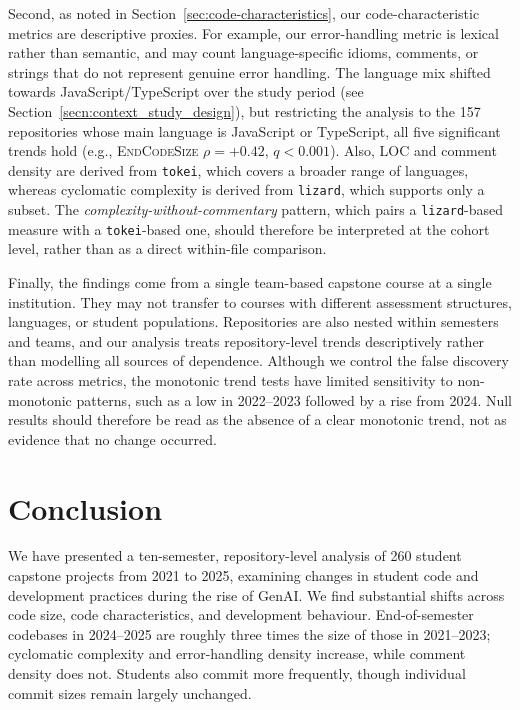 \documentclass[sigconf,authorversion]{acmart}
\newcommand{\todo}[1]{#1}
\begin{document}
\todo{Second, as noted in Section~\ref{sec:code-characteristics}, our code-characteristic metrics are descriptive proxies.} For example, our error-handling metric is lexical rather than semantic, and may count language-specific idioms, comments, or strings that do not represent \todo{genuine error handling}. The language mix shifted towards JavaScript/TypeScript over the study period (see Section~\ref{secn:context_study_design}), but restricting the analysis to the 157 repositories whose main language is JavaScript or TypeScript, all five significant trends hold (e.g., \textsc{EndCodeSize} $\rho = +0.42$, $q < 0.001$).
Also, LOC and comment density are derived from \texttt{tokei}, which covers a broader range of languages, whereas cyclomatic complexity is derived from \texttt{lizard}, which supports only a subset. The \emph{complexity-without-commentary} pattern, which pairs a \texttt{lizard}-based measure with a \texttt{tokei}-based one, should therefore be interpreted at the cohort level, rather than as a direct within-file comparison.

Finally, the findings come from a single team-based capstone course at a single institution. They may not transfer to courses with different assessment structures, languages, or student populations. Repositories are also nested within semesters and teams, and our analysis treats repository-level trends descriptively rather than modelling all sources of dependence. Although we control the false discovery rate across metrics, the monotonic trend tests have limited sensitivity to non-monotonic patterns, \todo{such as a low in 2022--2023 followed by a rise from 2024}. Null results should therefore be read as the absence of a clear monotonic trend, not as evidence that no change occurred.



\section{Conclusion}
\label{sec:conclusion}
We have presented a ten-semester, repository-level analysis of 260 student capstone projects from 2021 to 2025, examining changes in student code and development practices during the rise of GenAI. We find substantial shifts across code size, code characteristics, and development behaviour. \todo{End-of-semester codebases in 2024--2025 are roughly three times the size of those in 2021--2023;} cyclomatic complexity and error-handling density increase, while comment density does not. Students also commit more frequently, though individual commit sizes remain largely unchanged.
\end{document}
